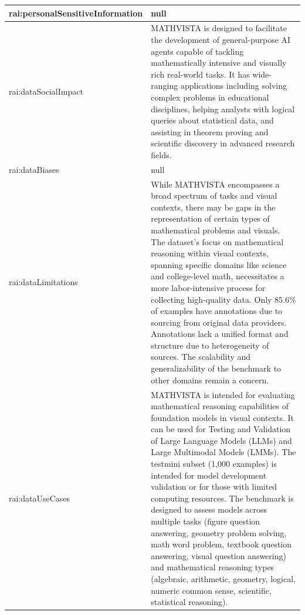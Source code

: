 \documentclass[10pt,a4paper]{article}
\begin{document}
\begin{longtable}{|p{4cm}|p{12cm}|}
\hline
rai:personalSensitiveInformation & null \\
\hline
rai:dataSocialImpact & MATHVISTA is designed to facilitate the development of general-purpose AI agents capable of tackling mathematically intensive and visually rich real-world tasks. It has wide-ranging applications including solving complex problems in educational disciplines, helping analysts with logical queries about statistical data, and assisting in theorem proving and scientific discovery in advanced research fields. \\
\hline
rai:dataBiases & null \\
\hline
rai:dataLimitations & While MATHVISTA encompasses a broad spectrum of tasks and visual contexts, there may be gaps in the representation of certain types of mathematical problems and visuals. The dataset's focus on mathematical reasoning within visual contexts, spanning specific domains like science and college-level math, necessitates a more labor-intensive process for collecting high-quality data. Only 85.6\% of examples have annotations due to sourcing from original data providers. Annotations lack a unified format and structure due to heterogeneity of sources. The scalability and generalizability of the benchmark to other domains remain a concern. \\
\hline
rai:dataUseCases & MATHVISTA is intended for evaluating mathematical reasoning capabilities of foundation models in visual contexts. It can be used for Testing and Validation of Large Language Models (LLMs) and Large Multimodal Models (LMMs). The testmini subset (1,000 examples) is intended for model development validation or for those with limited computing resources. The benchmark is designed to assess models across multiple tasks (figure question answering, geometry problem solving, math word problem, textbook question answering, visual question answering) and mathematical reasoning types (algebraic, arithmetic, geometry, logical, numeric common sense, scientific, statistical reasoning). \\
\hline
\end{longtable}
\end{document}
